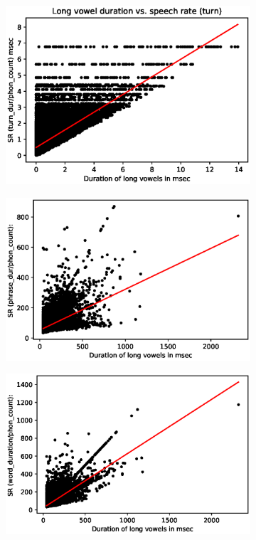 \documentclass[a4paper]{scrreprt}
\begin{document}
\begin{figure}[htbp]
\centering
	\begin{subfigure}[h]{0.48\textwidth}
	\centering
	\includegraphics[width=\textwidth]{../Graphen/SR_turn.eps}
	\label{fig:tsr}
	\end{subfigure}
\hfill
	\begin{subfigure}[h]{0.48\textwidth}
	\centering
	\includegraphics[width=\textwidth]{../Graphen/SR0.eps}
	\label{fig:phraseSR}
	\end{subfigure}
\hfill
	\begin{subfigure}[h]{0.48\textwidth}
	\centering
	\includegraphics[width=\textwidth]{../Graphen/SR4.eps}

\end{subfigure}
\end{figure}
\end{document}
